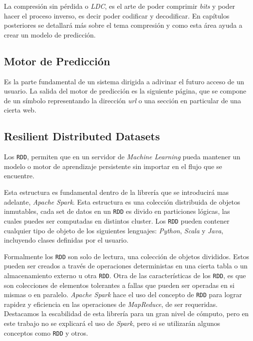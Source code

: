 La compresión sin pérdida o \emph{LDC}, es el arte de poder comprimir \emph{bits} y poder hacer el proceso inverso, es decir poder codificar y decodificar. En capítulos posteriores se detallará más sobre el tema compresión y como esta área ayuda a crear un modelo de predicción.





\subsection{Motor de Predicción}\label{concept-enginepredict}

Es la parte fundamental de un sistema dirigida a adivinar el futuro acceso de un usuario. La salida del motor de predicción es la siguiente página, que se compone de un símbolo representando la dirección \emph{url} o una sección en particular de una cierta web. 

 


\subsection{Resilient Distributed Datasets }\label{concept-RDD}

	Los \texttt{RDD}, permiten que en un servidor de \emph{Machine Learning } pueda mantener un modelo o motor de aprendizaje persistente sin importar en el flujo que se encuentre.

	Esta estructura es fundamental dentro de la librería que se introducirá mas adelante, \emph{Apache Spark}. Esta estructura es una colección distribuida de objetos inmutables, cada 
	set de datos en un \texttt{RDD} es divido en particiones lógicas, las cuales puedes ser computadas en distintos cluster. Los \texttt{RDD} pueden contener cualquier tipo de objeto de los siguientes lenguajes: \emph{Python}, \emph{Scala} y \emph{Java}, incluyendo clases definidas por el usuario. 

	Formalmente los \texttt{RDD} son solo de lectura, una colección de objetos divididos. Estos pueden ser creados a través de  operaciones deterministas en una cierta tabla o un almacenamiento externo u otra \texttt{RDD}.
	Otra de las características de los \texttt{RDD}, es que son colecciones de elementos tolerantes a fallas que pueden ser operadas en si mismas o en paralelo.
	\emph{Apache Spark} hace el uso del concepto de \texttt{RDD} para lograr rapidez y eficiencia en las operaciones de \emph{MapReduce}, de ser requeridas. Destacamos la escabilidad de esta librería para un gran nivel de cómputo, pero en este trabajo no se explicará el uso de \emph{Spark}, pero si se utilizarán algunos conceptos como \texttt{RDD} y otros.




